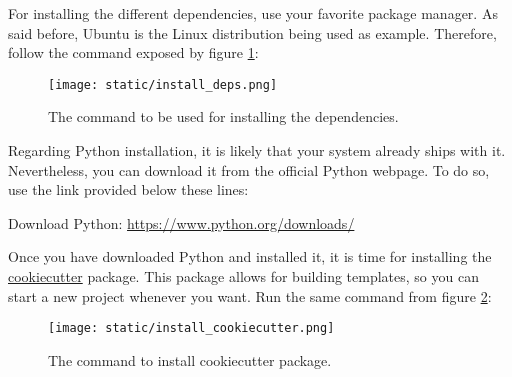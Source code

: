 For installing the different dependencies, use your favorite package manager. As
said before, Ubuntu is the Linux distribution being used as example. Therefore,
follow the command exposed by figure \ref{fig:install_deps}:

\begin{figure}[h]
  \centering
  \texttt{[image: static/install\_deps.png]}
  \caption{The command to be used for installing the dependencies.}
  \label{fig:install_deps}
\end{figure}

Regarding Python installation, it is likely that your system already ships with
it. Nevertheless, you can download it from the official Python webpage. To do
so, use the link provided below these lines:

\begin{center}
  Download Python: \href{https://www.python.org/downloads/}{https://www.python.org/downloads/}
\end{center}

Once you have downloaded Python and installed it, it is time for installing the
\href{https://github.com/cookiecutter/cookiecutter}{cookiecutter} package. This
package allows for building templates, so you can start a new \ESCRIBA project
whenever you want. Run the same command from figure
\ref{fig:install_cookiecutter}:

\begin{figure}[h]
  \centering
  \texttt{[image: static/install\_cookiecutter.png]}
  \caption{The command to install cookiecutter package.}
  \label{fig:install_cookiecutter}
\end{figure}
